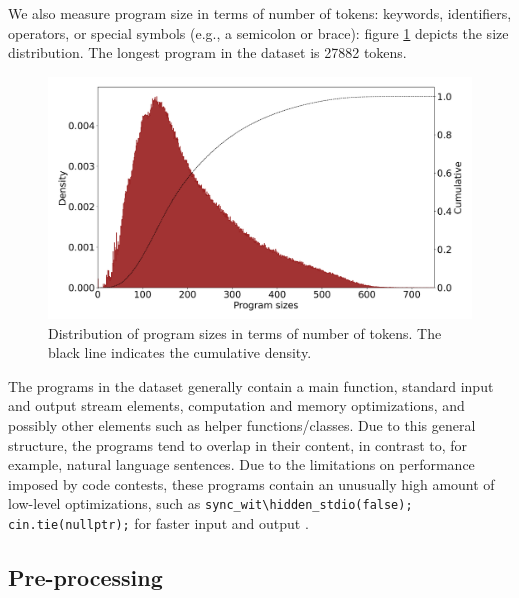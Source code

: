 \begin{table}
\centering

\label{tab:statistics_contests_problems}
\endgroup
\end{table}

We also measure program size in terms of number of tokens: keywords, identifiers, operators, or special symbols (e.g., a semicolon or brace): figure \ref{fig:program_sizes}
 depicts the size distribution. 
 The longest program in the dataset is 27882 tokens.

\begin{figure}
    \centering
    \includegraphics[width=\linewidth]{images/program_sizes.png}
    \caption[Distribution of program sizes]{Distribution of program sizes in terms of number of tokens. The black line indicates the cumulative density.}
    \label{fig:program_sizes}
\end{figure}

The programs in the dataset generally contain a main function, standard input and output stream elements, computation and memory optimizations, and possibly other elements such as helper functions/classes. Due to this general structure, the programs tend to overlap in their content, in contrast to, for example, natural language sentences. 
Due to the limitations on performance imposed by code contests, these programs contain an unusually high amount of low-level optimizations, such as \verb|sync_wit\hidden_stdio(false); cin.tie(nullptr);| for faster input and output \cite{usacoFastInputOutput}.

\subsection{Pre-processing}
\label{sec:tree2tree-preprocessing}

